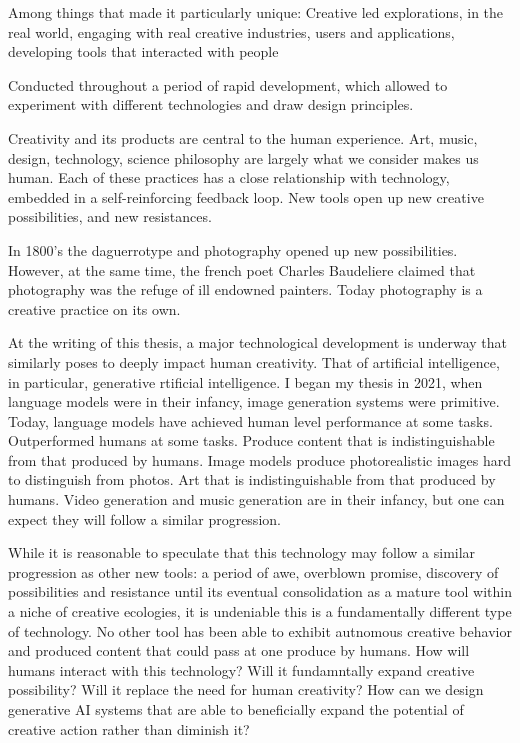 Among things that made it particularly unique: 
Creative led explorations, in the real world, engaging with real creative industries, users and applications, developing tools that interacted with people

Conducted throughout a period of rapid development, which allowed to experiment with different technologies and draw design principles. 






Creativity and its products are central to the human experience. Art, music, design, technology, science philosophy are largely what we consider makes us human. Each of these practices has a close relationship with technology, embedded in a self-reinforcing feedback loop. New tools open up new creative possibilities, and new resistances. 

In 1800's the daguerrotype and photography opened up new possibilities. However, at the same time, the french poet Charles Baudeliere claimed that photography was the refuge of ill endowned painters. Today photography is a creative practice on its own. 

At the writing of this thesis, a major technological development is underway that similarly poses to deeply impact human creativity. That of artificial intelligence, in particular, generative rtificial intelligence. I began my thesis in 2021, when language models were in their infancy, image generation systems were primitive. Today, language models have achieved human level performance at some tasks. Outperformed humans at some tasks. Produce content that is indistinguishable from that produced by humans. Image models produce photorealistic images hard to distinguish from photos. Art that is indistinguishable from that produced by humans. Video generation and music generation are in their infancy, but one can expect they will follow a similar progression. 



While it is reasonable to speculate that this technology may follow a similar progression as other new tools: a period of awe, overblown promise, discovery of possibilities and resistance until its eventual consolidation as a mature tool within a niche of  creative ecologies, it is undeniable this is a fundamentally different type of technology. No other tool has been able to exhibit autnomous creative behavior and produced content that could pass at one produce by humans. How will humans interact with this technology? Will it fundamntally expand creative possibility? Will it replace the need for human creativity? How can we design generative AI systems that are able to beneficially expand the potential of creative action rather than diminish it? 

